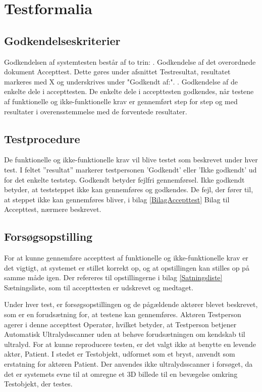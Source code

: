 \chapter{Testformalia}\label{Testformlia}

\section{Godkendelseskriterier}
Godkendelsen af systemtesten består af to trin: 
. Godkendelse af det overordnede dokument Accepttest. Dette gøres under afsnittet Testresultat, resultatet markeres med X og underskrives under "Godkendt af:".
. Godkendelse af de enkelte dele i accepttesten. De enkelte dele i accepttesten godkendes, når testene af funktionelle og ikke-funktionelle krav er gennemført step for step og med resultater
i overensstemmelse med de forventede resultater.

\section{Testprocedure}
De funktionelle og ikke-funktionelle krav vil blive testet som beskrevet under hver test. I feltet ”resultat” markerer testpersonen 'Godkendt' eller 'Ikke godkendt' ud for det enkelte teststep. 
Godkendt betyder fejlfri gennemførsel. 
Ikke godkendt betyder, at teststeppet ikke kan gennemføres og godkendes. De fejl, der fører til, at steppet ikke kan gennemføres bliver, i bilag \ref{BilagAccepttest} Bilag til Accepttest, nærmere beskrevet. 

\section{Forsøgsopstilling}
For at kunne gennemføre accepttest af funktionelle og ikke-funktionelle krav er det vigtigt, at systemet er stillet korrekt op, og at opstillingen kan stilles op på samme måde igen. Der refereres til opstillingerne i bilag \ref{Satningsliste} Sætningsliste, som til accepttesten er udskrevet og medtaget. 

Under hver test, er forsøgsopstillingen og de pågældende aktører blevet beskrevet, som er en forudsætning for, at testene kan gennemføres. Aktøren Testperson agerer i denne accepttest Operatør, hvilket betyder, at Testperson betjener Automatisk Ultralydsscanner uden at behøve forudsætningen om kendskab til ultralyd. For at kunne reproducere testen, er det valgt ikke at benytte en levende aktør, Patient. I stedet er Testobjekt, udformet som et bryst, anvendt som erstatning for aktøren Patient. Der anvendes ikke ultralydsscanner i forsøget, da det er systemets evne til at omregne et 3D billede til en bevægelse omkring Testobjekt, der testes. 




